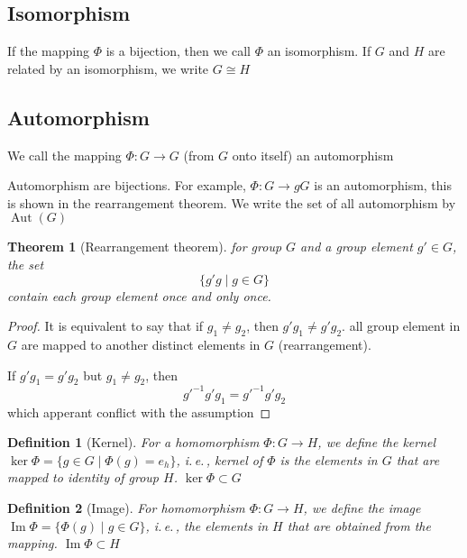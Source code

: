 \documentclass{amsart}
\newtheorem{definition}{Definition}
\newtheorem{theorem}{Theorem}
\DeclareMathOperator{\Aut}{Aut}
\DeclareMathOperator{\Image}{Im}
\begin{document}
\subsection*{Isomorphism}
    If the mapping $\Phi$ is a bijection, then we call $\Phi$ an isomorphism. If $G$ and $H$ are related by 
    an isomorphism, we write $G\cong H$

\subsection*{Automorphism}
    We call the mapping $\Phi\colon G \to G$ (from $G$ onto itself) an automorphism

Automorphism are bijections. For example, $\Phi\colon G \to gG$ is an automorphism, 
this is shown in the rearrangement theorem. We write the set of all automorphism by $\Aut(G)$ 

\vspace{10pt}

\begin{theorem}[Rearrangement theorem]
    for group $G$ and a group element $g'\in G$, the set 
    \[\{g'g \mid g \in G\}\]
    contain each group element once and only once.
\end{theorem}
\begin{proof}
    It is equivalent to say that if $g_1 \neq g_2$, then $g'g_1 \neq g'g_2$. all group element in $G$ are mapped 
    to another distinct elements in $G$ (rearrangement).

    If $g'g_1 = g'g_2$ but $g_1 \neq g_2$, then 
    \[ g'^{-1}g'g_1 = g'^{-1}g'g_2 \] which apperant conflict with the assumption
\end{proof}

\vspace{10pt}

\begin{definition}
    [Kernel] For a homomorphism $\Phi\colon G \to H$, we define the kernel $\ker\Phi = \{g\in G\mid \Phi(g) = e_h \}$, i.\,e.\,,
    kernel of $\Phi$ is the elements in $G$ that are mapped to identity of group $H$. $\ker\Phi \subset G$
\end{definition}

\begin{definition}
    [Image] For homomorphism $\Phi\colon G \to H$, we define the image $\Image\Phi = \{ \Phi(g) \mid g \in G \}$, i.\,e.\,,
    the elements in $H$ that are obtained from the mapping. $\Image\Phi \subset H$
\end{definition}
\end{document}
